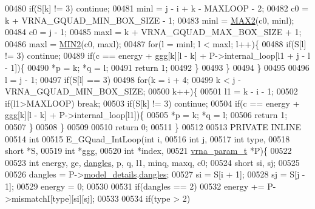 \begin{DoxyCode}
00480     \textcolor{keywordflow}{if}(S[k] != 3) \textcolor{keywordflow}{continue};
00481     minl  = j - i + k - MAXLOOP - 2;
00482     c0    = k + VRNA\_GQUAD\_MIN\_BOX\_SIZE - 1;
00483     minl  = \hyperlink{group__utils_ga33297b3679c713b0c4d897cd0fe3b122}{MAX2}(c0, minl);
00484     c0    = j - 1;
00485     maxl  = k + VRNA\_GQUAD\_MAX\_BOX\_SIZE + 1;
00486     maxl  = \hyperlink{group__utils_gae0b9cd0ce090bd69b951aa73e8fa4f7d}{MIN2}(c0, maxl);
00487     \textcolor{keywordflow}{for}(l = minl; l < maxl; l++)\{
00488       \textcolor{keywordflow}{if}(S[l] != 3) \textcolor{keywordflow}{continue};
00489       \textcolor{keywordflow}{if}(c == energy + ggg[k][l - k] + P->internal\_loop[l1 + j - l - 1])\{
00490         *p = k; *q = l;
00491         \textcolor{keywordflow}{return} 1;
00492       \}
00493     \}
00494   \}
00495 
00496   l = j - 1;
00497   \textcolor{keywordflow}{if}(S[l] == 3)
00498     \textcolor{keywordflow}{for}(k = i + 4;
00499         k < j - VRNA\_GQUAD\_MIN\_BOX\_SIZE;
00500         k++)\{
00501       l1    = k - i - 1;
00502       \textcolor{keywordflow}{if}(l1>MAXLOOP) \textcolor{keywordflow}{break};
00503       \textcolor{keywordflow}{if}(S[k] != 3) \textcolor{keywordflow}{continue};
00504       \textcolor{keywordflow}{if}(c == energy + ggg[k][l - k] + P->internal\_loop[l1])\{
00505         *p = k; *q = l;
00506         \textcolor{keywordflow}{return} 1;
00507       \}
00508     \}
00509 
00510   \textcolor{keywordflow}{return} 0;
00511 \}
00512 
00513 PRIVATE INLINE
00514 \textcolor{keywordtype}{int}
00515 E\_GQuad\_IntLoop(\textcolor{keywordtype}{int} i,
00516                 \textcolor{keywordtype}{int} j,
00517                 \textcolor{keywordtype}{int} type,
00518                 \textcolor{keywordtype}{short} *S,
00519                 \textcolor{keywordtype}{int} *ggg,
00520                 \textcolor{keywordtype}{int} *index,
00521                 \hyperlink{group__energy__parameters_structvrna__param__s}{vrna\_param\_t} *P)\{
00522 
00523   \textcolor{keywordtype}{int} energy, ge, \hyperlink{group__model__details_ga72b511ed1201f7e23ec437e468790d74}{dangles}, p, q, l1, minq, maxq, c0;
00524   \textcolor{keywordtype}{short} si, sj;
00525 
00526   dangles = P->\hyperlink{group__energy__parameters_a7b84353eb9075c595bad4ceb871bcae7}{model\_details}.\hyperlink{group__model__details_adcda4ff2ea77748ae0e8700288282efc}{dangles};
00527   si      = S[i + 1];
00528   sj      = S[j - 1];
00529   energy  = 0;
00530 
00531   \textcolor{keywordflow}{if}(dangles == 2)
00532     energy += P->mismatchI[type][si][sj];
00533 
00534   \textcolor{keywordflow}{if}(type > 2)

\end{DoxyCode}
